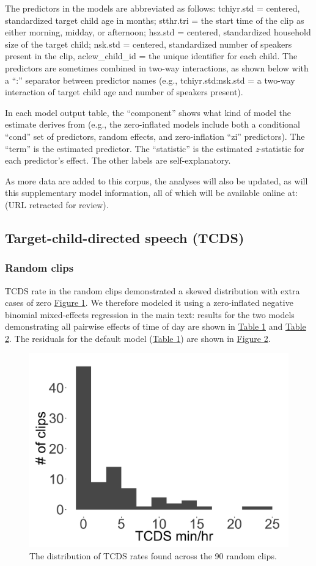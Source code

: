 \documentclass[floatsintext,man]{apa6}
\theoremstyle{definition}
\theoremstyle{definition}
\theoremstyle{definition}
\theoremstyle{remark}
\begin{document}
The predictors in the models are abbreviated as follows: tchiyr.std =
centered, standardized target child age in months; stthr.tri = the start
time of the clip as either morning, midday, or afternoon; hsz.std =
centered, standardized household size of the target child; nsk.std =
centered, standardized number of speakers present in the clip,
aclew\_child\_id = the unique identifier for each child. The predictors
are sometimes combined in two-way interactions, as shown below with a
\enquote{:} separator between predictor names (e.g., tchiyr.std:nsk.std
= a two-way interaction of target child age and number of speakers
present).

In each model output table, the \enquote{component} shows what kind of
model the estimate derives from (e.g., the zero-inflated models include
both a conditional \enquote{cond} set of predictors, random effects, and
zero-inflation \enquote{zi} predictors). The \enquote{term} is the
estimated predictor. The \enquote{statistic} is the estimated
\emph{z}-statistic for each predictor's effect. The other labels are
self-explanatory.

As more data are added to this corpus, the analyses will also be
updated, as will this supplementary model information, all of which will
be available online at: (URL retracted for review).

\subsection{Target-child-directed speech (TCDS)}\label{models-tcds}

\subsubsection{Random clips}\label{models-tcds-random}

TCDS rate in the random clips demonstrated a skewed distribution with
extra cases of zero \protect\hyperlink{fig1}{Figure 1}. We therefore
modeled it using a zero-inflated negative binomial mixed-effects
regression in the main text: results for the two models demonstrating
all pairwise effects of time of day are shown in
\protect\hyperlink{tab1}{Table 1} and \protect\hyperlink{tab2}{Table 2}.
The residuals for the default model (\protect\hyperlink{tab1}{Table 1})
are shown in \protect\hyperlink{fig2}{Figure 2}.

\FloatBarrier

\begin{figure}[H]

{\centering \includegraphics[width=0.4\linewidth]{www/TCDS_random_distribution} 

}

\caption{The distribution of TCDS rates found across the 90 random clips.}\label{fig:fig1}
\end{figure}
\end{document}
